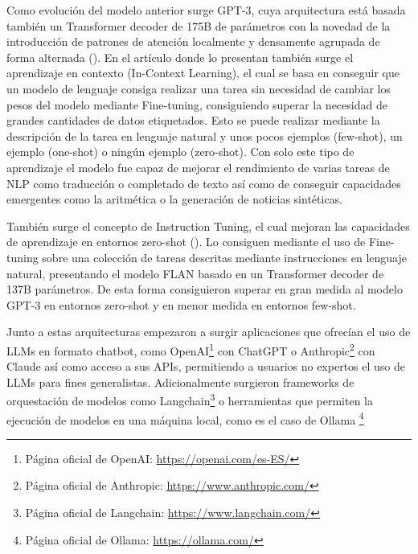 Como evolución del modelo anterior surge GPT-3, cuya arquitectura está basada también un Transformer decoder de 175B de parámetros con la novedad de la introducción de patrones de atención localmente y densamente agrupada de forma alternada (\cite{GPT-3}).
En el artículo donde lo presentan también surge el aprendizaje en contexto (In-Context Learning), el cual se basa en conseguir que un modelo de lenguaje consiga realizar una tarea sin necesidad de cambiar los pesos del modelo mediante Fine-tuning, consiguiendo superar la necesidad de grandes cantidades de datos etiquetados.
Esto se puede realizar mediante la descripción de la tarea en lenguaje natural y unos pocos ejemplos (few-shot), un ejemplo (one-shot) o ningún ejemplo (zero-shot).
Con solo este tipo de aprendizaje el modelo fue capaz de mejorar el rendimiento de varias tareas de NLP como traducción o completado de texto así como de conseguir capacidades emergentes como la aritmética o la generación de noticias sintéticas.

También surge el concepto de Instruction Tuning, el cual mejoran las capacidades de aprendizaje en entornos zero-shot (\cite{InstructionTuning}).
Lo consiguen mediante el uso de Fine-tuning sobre una colección de tareas descritas mediante instrucciones en lenguaje natural, presentando el modelo FLAN basado en un Transformer decoder de 137B parámetros.
De esta forma consiguieron superar en gran medida al modelo GPT-3 en entornos zero-shot y en menor medida en entornos few-shot.

Junto a estas arquitecturas empezaron a surgir aplicaciones que ofrecían el uso de LLMs en formato chatbot, como OpenAI\footnote{Página oficial de OpenAI: \url{https://openai.com/es-ES/}} con ChatGPT o Anthropic\footnote{Página oficial de Anthropic: \url{https://www.anthropic.com/}} con Claude así como acceso a sus APIs, permitiendo a usuarios no expertos el uso de LLMs para fines generalistas.
Adicionalmente surgieron frameworks de orquestación de modelos como Langchain\footnote{Página oficial de Langchain: \url{https://www.langchain.com/}} o herramientas que permiten la ejecución de modelos en una máquina local, como es el caso de Ollama \footnote{Página oficial de Ollama: \url{https://ollama.com/}}

